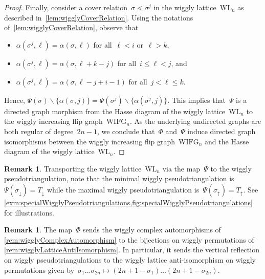 \documentclass{amsart}
\theoremstyle{definition}
\newtheorem{remark}[theorem]{Remark}
\newcommand{\ssm}{\smallsetminus} %
\newcommand{\wigglyIncreasingFlipGraph}{\mathrm{WIFG}} %
\newcommand{\wigglyLattice}{\mathrm{WL}} %
\begin{document}
\begin{proof}
\pagebreak
Finally, consider a cover relation~$\sigma \lessdot \sigma^j$ in the wiggly lattice~$\wigglyLattice_n$ as described in~\cref{lem:wigglyCoverRelation}.
Using the notations of~\cref{lem:wigglyCoverRelation}, observe that
\begin{itemize}
\item $\alpha(\sigma^j, \ell) = \alpha(\sigma, \ell)$ for all~$\ell < i$ or~$\ell > k$,
\item $\alpha(\sigma^j, \ell) = \alpha(\sigma, \ell+k-j)$ for all~$i \le \ell < j$, and
\item $\alpha(\sigma^j, \ell) = \alpha(\sigma, \ell-j+i-1)$ for all~$j < \ell \le k$.
\end{itemize}
Hence, $\Psi(\sigma) \ssm \{\alpha(\sigma, j)\} = \Psi(\sigma^j) \ssm \{\alpha(\sigma^j, j)\}$.
This implies that~$\Psi$ is a directed graph morphism from the Hasse diagram of the wiggly lattice~$\wigglyLattice_n$ to the wiggly increasing flip graph~$\wigglyIncreasingFlipGraph_n$.
As the underlying undirected graphs are both regular of degree~$2n-1$, we conclude that~$\Phi$ and~$\Psi$ induce directed graph isomorphisms between the wiggly increasing flip graph~$\wigglyIncreasingFlipGraph_n$ and the Hasse diagram of the wiggly lattice~$\wigglyLattice_n$.
\end{proof}

\begin{remark}
Transporting the wiggly lattice~$\wigglyLattice_n$ via the map~$\Psi$ to the wiggly pseudotriangulation, note that the minimal wiggly pseudotriangulation is~$\Psi(\sigma_\downarrow) = T_\downarrow$ while the maximal wiggly pseudotriangulation is~$\Psi(\sigma_\uparrow) = T_\uparrow$. See \cref{exm:specialWigglyPseudotriangulations,fig:specialWigglyPseudotriangulations} for illustrations.
\end{remark}

\begin{remark}
The map~$\Phi$ sends the wiggly complex automorphisms of \cref{rem:wigglyComplexAutomorphism} to the bijections on wiggly permutations of \cref{rem:wigglyLatticeAntiIsomorphism}. In particular, it sends the vertical reflection on wiggly pseudotriangulations to the wiggly lattice anti-isomorphism on wiggly permutations given by~$\sigma_1 \dots \sigma_{2n} \mapsto (2n+1-\sigma_1) \dots (2n+1-\sigma_{2n})$.
\end{remark}
\end{document}
